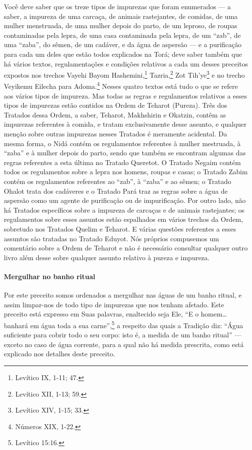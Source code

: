 Você deve saber que os treze tipos de impurezas que foram enumerados
--- a saber, a impureza de uma carcaça, de animais rastejantes, de
comidas, de uma mulher menstruada, de uma mulher depois do parto, de um
leproso, de roupas contaminadas pela lepra, de uma casa contaminada
pela lepra, de um ``zab'', de uma ``zaba'', do sêmen, de um cadáver, e
da água de aspersão --- e a purificação para cada um deles que estão
todos explicados na Torá; deve saber também que há vários textos, regulamentações e condições relativos a cada um desses preceitos expostos nos trechos Vayehi Bayom
Hashemini,\footnote{Levítico IX, 1-11; 47.} Tazria,\footnote{Levítico XII, 1-13; 59.} Zot
Tih'ye\footnote{Levítico XIV, 1-15; 33.} e no trecho Veyikemu Eilecha para
Adoma.\footnote{Números XIX, 1-22.}
Nesses quatro textos está tudo o que se refere aos vários tipos de
impureza. Mas todas as regras e regulamentos relativos a esses tipos de
impurezas estão contidos na Ordem de Teharot (Pureza). Três dos
Tratados dessa Ordem, a saber, Teharot, Makhshirin e Okatzin, contêm as
impurezas referentes à comida, e tratam exclusivamente desse assunto, e
qualquer menção sobre outras impurezas nesses Tratados é meramente
acidental. Da mesma forma, o Nidá contém os regulamentos referentes à
mulher mestruada, à ``zaba'' e à mulher depois do parto, sendo que
também se encontram algumas das regras referentes a esta última no
Tratado Queretot. O Tratado Negaim contém todos os regulamentos sobre a
lepra nos homens, roupas e casas; o Tratado Zabim contém os
regulamentos referentes ao ``zab'', à ``zaba'' e ao sêmen; o Tratado
Ohalot trata dos cadáveres e o Tratado Pará traz as regras sobre a água
de aspersão como um agente de purificação ou de impurificação. Por outro
lado, não há Tratados específicos sobre a impureza de carcaças e de
animais rastejantes; os regulamentos sobre esses assuntos estão
espalhados em vários trechos da Ordem, sobretudo nos Tratados Quelim e
Teharot. E várias questões referentes a esses assuntos são tratadas no
Tratado Eduyot. Nós próprios compusemos um comentário sobre a Ordem de
Teharot e não é necessário consultar qualquer outro livro além desse
sobre qualquer assunto relativo à pureza e impureza.

\paragraph{Mergulhar no banho ritual}

Por este preceito somos ordenados a mergulhar nas águas de um banho
ritual, e assim limpar-nos de todo tipo de impurezas que nos tenham
afetado. Este preceito está expresso em Suas palavras, enaltecido seja
Ele, ``E o homem\ldots{} banhará em água toda a sua carne'',\footnote{Levítico
15:16.} a respeito das quais a Tradição diz: ``Água suficiente para
cobrir todo o seu corpo: isto é, a medida de um banho ritual'' ---
exceto no caso de água corrente, para a qual não há medida prescrita,
como está explicado nos detalhes deste preceito.

